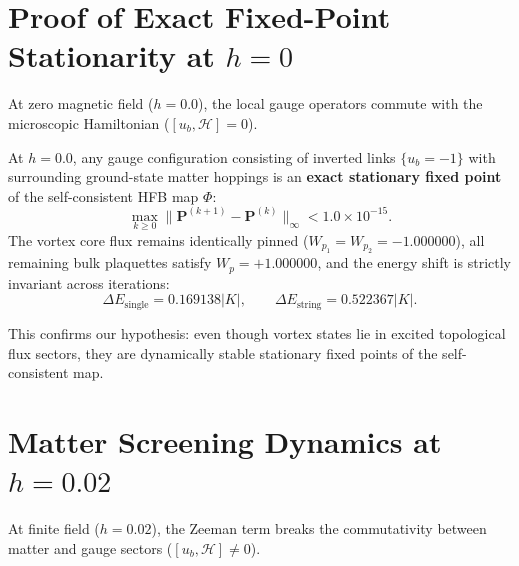 \section{Proof of Exact Fixed-Point Stationarity at $h=0$}
\label{sec:phase4_stationarity_h0}

At zero magnetic field ($h = 0.0$), the local gauge operators commute with the microscopic Hamiltonian ($[u_b, \mathcal{H}] = 0$).

\begin{theorem}
At $h = 0.0$, any gauge configuration consisting of inverted links $\{u_b = -1\}$ with surrounding ground-state matter hoppings is an \textbf{exact stationary fixed point} of the self-consistent HFB map $\Phi$:
\begin{equation}
\label{eq:phase4_stationarity_metric}
\max_{k \ge 0} \| \mathbf{P}^{(k+1)} - \mathbf{P}^{(k)} \|_{\infty} < 1.0 \times 10^{-15}.
\end{equation}
The vortex core flux remains identically pinned ($W_{p_1} = W_{p_2} = -1.000000$), all remaining bulk plaquettes satisfy $W_p = +1.000000$, and the energy shift is strictly invariant across iterations:
\begin{equation}
\Delta E_{\mathrm{single}} = 0.169138 |K|, \qquad \Delta E_{\mathrm{string}} = 0.522367 |K|.
\end{equation}
\end{theorem}
This confirms our hypothesis: even though vortex states lie in excited topological flux sectors, they are dynamically stable stationary fixed points of the self-consistent map.

\section{Matter Screening Dynamics at $h = 0.02$}
\label{sec:phase4_screening_h002}

At finite field ($h = 0.02$), the Zeeman term breaks the commutativity between matter and gauge sectors ($[u_b, \mathcal{H}] \neq 0$). 

